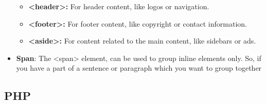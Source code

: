 \documentclass{report}
\begin{document}
\begin{itemize}
\begin{itemize}
            \item \textbf{<header>:} For header content, like logos or navigation.
            \item \textbf{<footer>:} For footer content, like copyright or contact information.
            \item \textbf{<aside>:} For content related to the main content, like sidebars or ads.
        \end{itemize}
    \item \textbf{Span}: The <span> element, can be used to group inline elements only. So, if you have a part of a sentence or paragraph which you want to group together
    \end{itemize}

    \pagebreak 
    \subsection{PHP}
\end{document}
